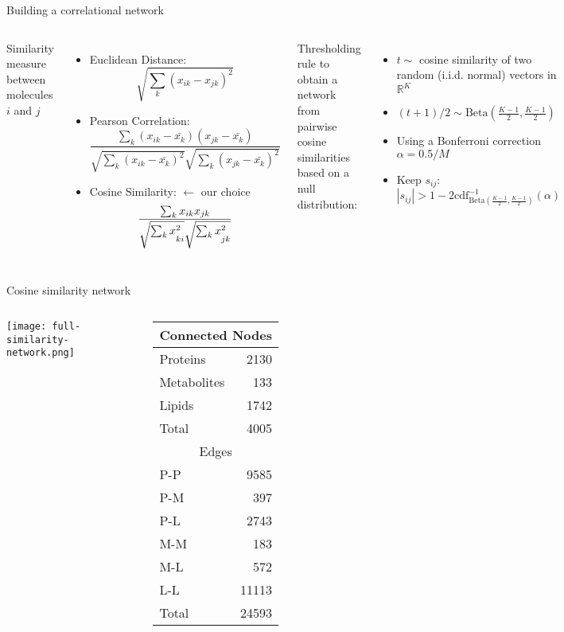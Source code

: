 \documentclass[aspectratio=169]{beamer}
\begin{document}

\begin{frame}{Building a correlational network}
\begin{columns}
	 \small
	Similarity measure between molecules $i$ and $j$
	\begin{itemize}
		\item Euclidean Distance:
		\[
		\sqrt{ \sum_{k} (x_{ik} - x_{jk})^2 }
		\]\pause
		\item Pearson Correlation:
		\[
		\frac{\sum_k ( x_{ik} - \bar{x_k} ) ( x_{jk} - \bar{ x_k } ) }{ \sqrt{ \sum_k ( x_{ik} - \bar{x_k} )^2 } \sqrt{ \sum_k ( x_{jk} - \bar{ x_k } )^2 } }
		\]\pause
		\item Cosine Similarity: \alert{$\leftarrow$ our choice}
		\[
		\frac{\sum_k x_{ik} x_{jk}}{ \sqrt{ \sum_k x_{ki\strut}^2 } \sqrt{ \sum_k x_{jk\strut}^2 } }
		\]\pause
	\end{itemize}
	 \small
	Thresholding rule to obtain a network from pairwise cosine similarities based on a null distribution:
	\pause
	
	\begin{itemize}
	\item $t \sim$ cosine similarity of two random (i.i.d. normal) vectors in $\mathbb R^K$
	\item $(t + 1)/2 \sim \mathrm{Beta}( \frac{K - 1}{2}, \frac{K - 1}{2} )$ \pause
	\item Using a Bonferroni correction $\alpha = 0.5/M$
	\item Keep $s_{ij}:$
	\[ | s_{ij} | > 1 - 2 \mathrm{cdf}^{-1}_{\mathrm{Beta}\left( \frac{K - 1}{2}, \frac{K - 1}{2} \right) }\left(  \alpha \right) \]
	\end{itemize}
\end{columns}
\end{frame}


\begin{frame}{Cosine similarity network}
\begin{columns}
	\texttt{[image: full-similarity-network.png]}
	\begin{tabular}{l|r}
		\multicolumn{2}{c}{Connected Nodes} \\ \hline
		Proteins & 2130 \\
		Metabolites & 133 \\
		Lipids & 1742 \\ \hline
		Total & 4005 \\ \hline \hline
		\multicolumn{2}{c}{Edges} \\ \hline
		P-P & 9585 \\
		P-M & 397 \\
		P-L & 2743 \\
		M-M & 183 \\
		M-L & 572 \\
		L-L & 11113 \\ \hline
		Total & 24593
	\end{tabular}
\end{columns}
\end{frame}
\end{document}
